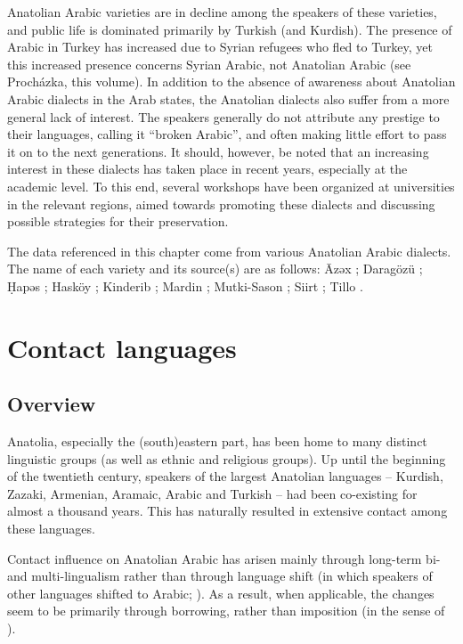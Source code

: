 \documentclass[output=paper]{langsci/langscibook}
\begin{document}
Anatolian Arabic varieties are in decline among the speakers of these varieties, and public life is dominated primarily by Turkish (and Kurdish). The presence of Arabic in Turkey has increased due to Syrian refugees who fled to Turkey, yet this increased presence concerns Syrian Arabic, not Anatolian Arabic (see Proch\'{a}zka, this volume). In addition to the absence of awareness about Anatolian Arabic dialects in the Arab states, the Anatolian dialects also suffer from a more general lack of interest. The speakers generally do not attribute any prestige to their languages, calling it ``broken Arabic'', and often making little effort to pass it on to the next generations. It should, however, be noted that an increasing interest in these dialects has taken place in recent years, especially at the academic level. To this end, several workshops have been organized at universities in the relevant regions, aimed towards promoting these dialects and discussing possible strategies for their preservation.  

The data referenced in this chapter come from various Anatolian Arabic dialects. The name of each variety and its source(s) are as follows: \={A}zəx \citep{Wittrich2001}; Darag\"{o}z\"{u} \citep{Jastrow1973}; \d{H}apəs \citep{Talay2007}; Hask\"{o}y \citep{Talay2001,Talay2002}; Kinderib \citep{Jastrow1978};  Mardin  \citep{Jastrow2006,Grigore2007article,GrigoreBituna2012}; Mutki-Sason \citep{Akkus2016,Akkus2017,Isaksson2005}; Siirt \citep{Bituna2016,GrigoreBituna2012}; Tillo \citep{Lahdo2009}.

\section{Contact languages}

\subsection{Overview}
Anatolia, especially the (south)eastern part, has been home to many distinct linguistic groups (as well as ethnic and religious groups). Up until the beginning of the twentieth century, speakers of the largest Anatolian languages -- Kurdish, Zazaki, Armenian, Aramaic, Arabic and Turkish -- had been co-existing for almost a thousand years. This has naturally resulted in extensive contact among these languages.  

Contact influence on Anatolian Arabic has arisen mainly through long-term bi- and multi-lingualism rather than through language shift (in which speakers of other languages shifted to Arabic; \citealt{Thomason2001}). 
As a result, when applicable, the changes seem to be primarily through borrowing, rather than imposition (in the sense of \citealt{VanCoetsem1988,VanCoetsem2000}). 
\end{document}
